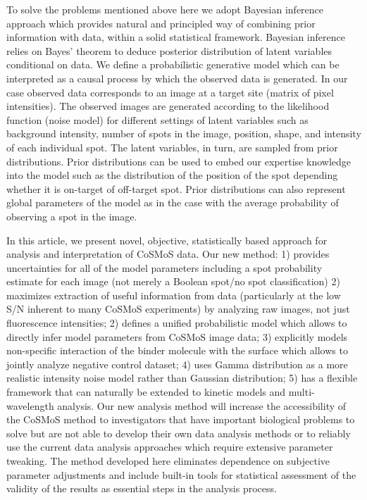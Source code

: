 To solve the problems mentioned above here we adopt Bayesian inference approach which provides natural and principled way of combining prior information with data, within a solid statistical framework. Bayesian inference relies on Bayes' theorem to deduce posterior distribution of latent variables conditional on data. We define a probabilistic generative model which can be interpreted as a causal process by which the observed data is generated. In our case observed data corresponds to an image at a target site (matrix of pixel intensities). The observed images are generated according to the likelihood function (noise model) for different settings of latent variables such as background intensity, number of spots in the image, position, shape, and intensity of each individual spot. The latent variables, in turn, are sampled from prior distributions. Prior distributions can be used to embed our expertise knowledge into the model such as the distribution of the position of the spot depending whether it is on-target of off-target spot. Prior distributions can also represent global parameters of the model as in the case with the average probability of observing a spot in the image.

In this article, we present novel, objective, statistically based approach for analysis and interpretation of CoSMoS data. Our new method: 1) provides uncertainties for all of the model parameters including a spot probability estimate for each image (not merely a Boolean spot/no spot classification) 2) maximizes extraction of useful information from data (particularly at the low S/N inherent to many CoSMoS experiments) by analyzing raw images, not just fluorescence intensities; 2) defines a unified probabilistic model which allows to directly infer model parameters from CoSMoS image data; 3) explicitly models non-specific interaction of the binder molecule with the surface which allows to jointly analyze negative control dataset; 4) uses Gamma distribution as a more realistic intensity noise model rather than Gaussian distribution; 5) has a flexible framework that can naturally be extended to kinetic models and multi-wavelength analysis. Our new analysis method will increase the accessibility of the CoSMoS method to investigators that have important biological problems to solve but are not able to develop their own data analysis methods or to reliably use the current data analysis approaches which require extensive parameter tweaking. The method developed here eliminates dependence on subjective parameter adjustments and include built-in tools for statistical assessment of the validity of the results as essential steps in the analysis process.